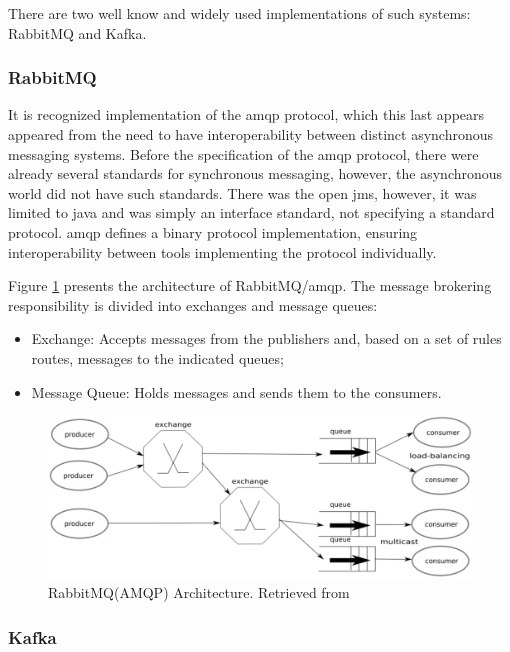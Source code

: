 There are two well know and widely used implementations of such systems: RabbitMQ and Kafka\cite{kafka-vs-rabbitmq}.

\subsubsection{RabbitMQ}

It is recognized implementation of the \gls{amqp} protocol, which this last appears appeared from the need to have interoperability between distinct asynchronous messaging systems.
Before the specification of the \gls{amqp} protocol, there were already several standards for synchronous messaging, however, the asynchronous world did not have such standards.
There was the open \gls{jms}, however, it was limited to java and was simply an interface standard, not specifying a standard protocol.
\gls{amqp} defines a binary protocol implementation, ensuring interoperability between tools implementing the protocol individually.

Figure \ref{fig:rabbitmq} presents the architecture of RabbitMQ/\gls{amqp}.
The message brokering responsibility is divided into exchanges and message queues:

\begin{itemize}
    \item Exchange: Accepts messages from the publishers and, based on a set of rules routes, messages to the indicated queues;
    \item Message Queue: Holds messages and sends them to the consumers.
\end{itemize}

\begin{figure}[H]
    \center
    \includegraphics[width=.9\textwidth]{rabbitmq}
    \caption{RabbitMQ(AMQP) Architecture. Retrieved from \cite{kafka-vs-rabbitmq}}
    \label{fig:rabbitmq}
\end{figure}

\subsubsection{Kafka}

